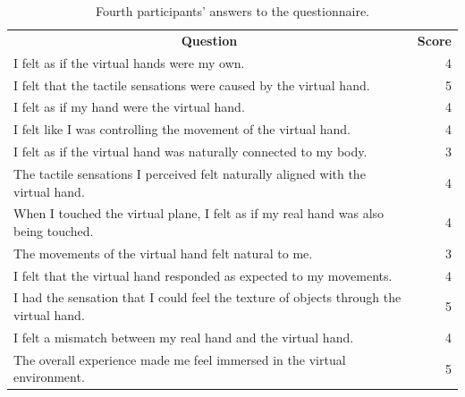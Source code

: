 \documentclass[uplatex,
12pt, %
a4paper,
english, %
oneside,
titlepage,
singlespacing, %
liststotoc, %
headsepline,
]{MastersDoctoralThesis} %
\begin{document}
\begin{appendices}
\begin{table}[H]
  \centering
  \caption{Fourth participants' answers to the questionnaire.}
    \begin{tabular}{|lrrrrrrrr|r|}
    \toprule
    \multicolumn{9}{c|}{\multirow{2}[2]{*}{\textbf{Question}}}            & \multicolumn{1}{c|}{\multirow{2}[2]{*}{\textbf{Score}}} \\
    \multicolumn{9}{c|}{}                                                 &  \\
    \midrule
    \multicolumn{9}{|l|}{I felt as if the virtual hands were my own.}     & 4 \\
    \midrule
    \multicolumn{9}{|l|}{I felt that the tactile sensations were caused by the virtual hand.} & 5 \\
    \midrule
    \multicolumn{9}{|l|}{I felt as if my hand were the virtual hand.}     & 4 \\
    \midrule
    \multicolumn{9}{|l|}{I felt like I was controlling the movement of the virtual hand.} & 4 \\
    \midrule
    \multicolumn{9}{|l|}{I felt as if the virtual hand was naturally connected to my body.} & 3 \\
    \midrule
    \multicolumn{9}{|l|}{The tactile sensations I perceived felt naturally aligned with the virtual hand.} & 4 \\
    \midrule
    \multicolumn{9}{|l|}{When I touched the virtual plane, I felt as if my real hand was also being touched.} & 4 \\
    \midrule
    \multicolumn{9}{|l|}{The movements of the virtual hand felt natural to me.} & 3 \\
    \midrule
    \multicolumn{9}{|l|}{I felt that the virtual hand responded as expected to my movements.} & 4 \\
    \midrule
    \multicolumn{9}{|l|}{I had the sensation that I could feel the texture of objects through the virtual hand.} & 5 \\
    \midrule
    \multicolumn{9}{|l|}{I felt a mismatch between my real hand and the virtual hand. } & 4 \\
    \midrule
    \multicolumn{9}{|l|}{The overall experience made me feel immersed in the virtual environment.} & 5 \\
    \bottomrule
    \end{tabular}%
  \label{tab:Q_4}%
\end{table}%


\end{appendices}
\end{document}
